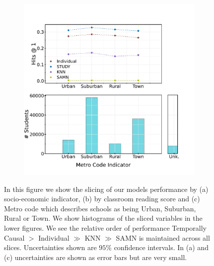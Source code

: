 \documentclass{article}
\begin{document}
\begin{figure}[]
\begin{subfigure}{0.4\linewidth}
        \caption{}
    \end{subfigure}
    \begin{subfigure}{0.4\linewidth}
        \includegraphics[width=\linewidth]{figures/metro_code.pdf}
        \caption{}
    \end{subfigure}
    \caption{In this figure we show the slicing of our models performance by (a) socio-economic indicator, (b) by classroom reading score and (c) Metro code which describes schools as being Urban, Suburban, Rural or Town. We show histograms of the sliced variables in the lower figures. We see the relative order of performance Temporally Causal $>$ Individual $\gg$ KNN $\gg$ SAMN is maintained across all slices. Uncertainties shown are $95\%$ confidence intervals. In (a) and (c) uncertainties are shown as error bars but are very small.}
    \label{fig:slices}
\end{figure}
\end{document}
